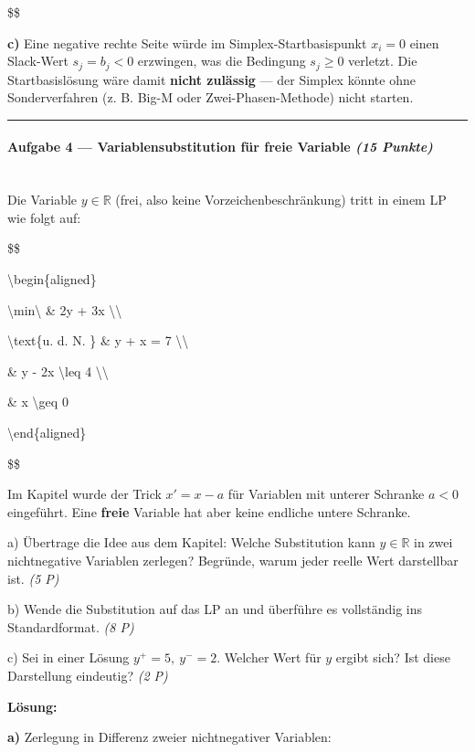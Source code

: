 \documentclass[11pt, a4paper]{article}
\begin{document}
\$\$


\textbf{c)} Eine negative rechte Seite würde im Simplex-Startbasispunkt $x_i = 0$ einen Slack-Wert $s_j = b_j < 0$ erzwingen, was die Bedingung $s_j \geq 0$ verletzt. Die Startbasislösung wäre damit \textbf{nicht zulässig} — der Simplex könnte ohne Sonderverfahren (z. B. Big-M oder Zwei-Phasen-Methode) nicht starten.



\noindent\textcolor{rulegray}{\rule{\linewidth}{0.4pt}}


\paragraph{Aufgabe 4 — Variablensubstitution für freie Variable \textit{(15 Punkte)}}\mbox{}\\[2pt]

Die Variable $y \in \mathbb{R}$ (frei, also keine Vorzeichenbeschränkung) tritt in einem LP wie folgt auf:


\$\$

\textbackslash{}begin\{aligned\}

\textbackslash{}min\textbackslash{} \& 2y + 3x \textbackslash{}\textbackslash{}

\textbackslash{}text\{u. d. N. \} \& y + x = 7 \textbackslash{}\textbackslash{}

\& y - 2x \textbackslash{}leq 4 \textbackslash{}\textbackslash{}

\& x \textbackslash{}geq 0

\textbackslash{}end\{aligned\}

\$\$


Im Kapitel wurde der Trick $x' = x - a$ für Variablen mit unterer Schranke $a < 0$ eingeführt. Eine \textbf{freie} Variable hat aber keine endliche untere Schranke.


a) Übertrage die Idee aus dem Kapitel: Welche Substitution kann $y \in \mathbb{R}$ in zwei nichtnegative Variablen zerlegen? Begründe, warum jeder reelle Wert darstellbar ist. \textit{(5 P)}

b) Wende die Substitution auf das LP an und überführe es vollständig ins Standardformat. \textit{(8 P)}

c) Sei in einer Lösung $y^+ = 5,\ y^- = 2$. Welcher Wert für $y$ ergibt sich? Ist diese Darstellung eindeutig? \textit{(2 P)}


\textbf{Lösung:}


\textbf{a)} Zerlegung in Differenz zweier nichtnegativer Variablen:
\end{document}
